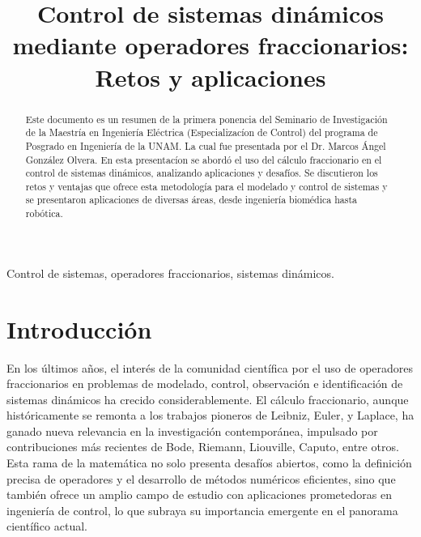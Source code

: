 \documentclass[conference]{IEEEtran}
\begin{document}
\title{Control de sistemas dinámicos mediante operadores fraccionarios: Retos y aplicaciones\\
}

\author{
	\and
}

\maketitle

\begin{abstract}
	Este documento es un resumen de la primera ponencia del Seminario de Investigación de la Maestría en Ingeniería Eléctrica (Especializacíon de Control) del programa de Posgrado en Ingeniería de la UNAM. La cual fue presentada por el Dr. Marcos Ángel González Olvera. En esta presentacíon se abordó el uso del cálculo fraccionario en el control de sistemas dinámicos, analizando aplicaciones y desafíos. Se discutieron los retos y ventajas que ofrece esta metodología para el modelado y control de sistemas y se presentaron aplicaciones de diversas áreas, desde ingeniería biomédica hasta robótica.
\end{abstract}

\begin{IEEEkeywords}
	Control de sistemas, operadores fraccionarios, sistemas dinámicos.
\end{IEEEkeywords}

\section{Introducción}
En los últimos años, el interés de la comunidad científica por el uso de operadores fraccionarios en problemas de modelado, control, observación e identificación de sistemas dinámicos ha crecido considerablemente. El cálculo fraccionario, aunque históricamente se remonta a los trabajos pioneros de Leibniz, Euler, y Laplace, ha ganado nueva relevancia en la investigación contemporánea, impulsado por contribuciones más recientes de Bode, Riemann, Liouville, Caputo, entre otros. Esta rama de la matemática no solo presenta desafíos abiertos, como la definición precisa de operadores y el desarrollo de métodos numéricos eficientes, sino que también ofrece un amplio campo de estudio con aplicaciones prometedoras en ingeniería de control, lo que subraya su importancia emergente en el panorama científico actual.
\end{document}
